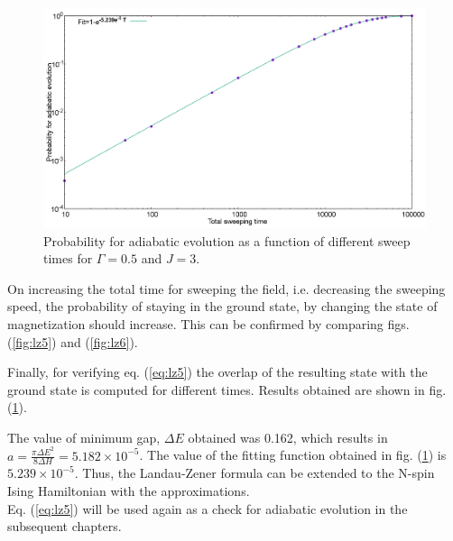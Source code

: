\documentclass[../main.tex]{subfiles}
\begin{document}
\begin{figure}[H]
\centering 
\includegraphics[scale=0.24]{Probability_H100.png}
\caption{Probability for adiabatic evolution as a function of different sweep times for $\Gamma=0.5$ and $J=3$.}
\label{fig:lz7}
\end{figure}

On increasing the total time for sweeping the field, i.e. decreasing the sweeping speed, the probability of staying in the ground state, by changing the state of magnetization should increase. This can be confirmed by comparing figs. (\ref{fig:lz5}) and (\ref{fig:lz6}).

Finally, for verifying eq. ({\ref{eq:lz5}}) the overlap of the resulting state with the ground state is computed for different times. Results obtained are shown in fig. (\ref{fig:lz7}). 

The value of minimum gap, $\Delta E$ obtained was 0.162, which results in $a=\frac{\pi \Delta E^2}{8 \Delta H}= 5.182 \times 10^{-5}$. The value of the fitting function obtained in fig. (\ref{fig:lz7}) is $5.239 \times 10^{-5}$. Thus, the Landau-Zener formula can be extended to the N-spin Ising Hamiltonian with the approximations.\\

Eq. (\ref{eq:lz5}) will be used again as a check for adiabatic evolution in the subsequent chapters.
\end{document}

